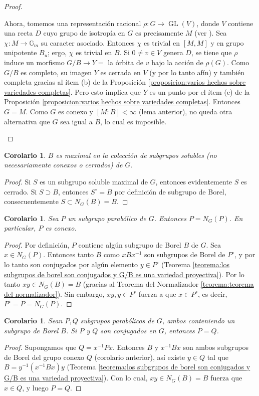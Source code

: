 \documentclass[spanish,10pt]{amsart}
\newtheorem{corollary}[theorem]{Corolario}
\theoremstyle{definition}
\theoremstyle{remark}
\numberwithin{equation}{section}
\begin{document}
\begin{proof}
\begin{enumerate}
Ahora, tomemos una representación racional $\rho : G \rightarrow \operatorname{GL}(V)$, donde $V$ contiene una recta $D$ cuyo grupo de isotropía en $G$ es precisamente $M$ (ver \cite[Teorema 11.2]{humphreys2012linearAlgebraicGroups}). Sea $\chi : M \to \mathbb{G}_m$ su caracter asociado. Entonces $\chi$ es trivial en $[M,M]$ y en grupo unipotente $B_u$; ergo, $\chi$ es trivial en $B$. Si $0 \neq v \in V$ genera $D$, se tiene que $\rho$ induce un morfismo $G/B \to Y =$ la órbita de $v$ bajo la acción de $\rho (G)$. Como $G/B$ es completo, su imagen $Y$ es cerrada en $V$ (y por lo tanto afín) y también completa gracias al ítem (b) de la Proposición \ref{proposicion:varios hechos sobre variedades completas}. Pero esto implica que $Y$ es un punto por el ítem (c) de la Proposición \ref{proposicion:varios hechos sobre variedades completas}. Entonces $G = M$. Como $G$ es conexo y $[M : B] < \infty$ (lema anterior), no queda otra alternativa que $G$ sea igual a $B$, lo cual es imposible.
\end{enumerate}
\end{proof}

\begin{corollary}
$B$ es maximal en la colección de subgrupos solubles (no necesariamente conexos o cerrados) de $G$.
\end{corollary}
\begin{proof}
Si $S$ es un subgrupo soluble maximal de $G$, entonces evidentemente $S$ es cerrado. Si $S \supset B$, entonces $S^\circ = B$ por definición de subgrupo de Borel, consecuentemente $S \subset N_G (B) = B$.
\end{proof}

\begin{corollary}
Sea $P$ un subgrupo parabólico de $G$. Entonces $P = N_G (P)$. En particular, $P$ es conexo.
\end{corollary}
\begin{proof}
Por definición, $P$ contiene algún subgrupo de Borel $B$ de $G$. Sea $x \in N_G (P)$. Entonces tanto $B$ como $x B x^{-1}$ son subgrupos de Borel de $P^\circ$, y por lo tanto son conjugados por algún elemento $y \in P^\circ$ (Teorema \ref{teorema:los subgrupos de borel son conjugados y G/B es una variedad proyectiva}). Por lo tanto $xy \in N_G (B) = B$ (gracias al Teorema del Normalizador \ref{teorema:teorema del normalizador}). Sin embargo, $xy, y \in P^\circ$ fuerza a que $x \in P^\circ$, es decir, $P^\circ = P = N_G (P)$.
\end{proof}

\begin{corollary}
Sean $P,Q$ subgrupos parabólicos de $G$, ambos conteniendo un subgrupo de Borel $B$. Si $P$ y $Q$ son conjugados en $G$, entonces $P = Q$.
\end{corollary}
\begin{proof}
Supongamos que $Q = x^{-1} P x$. Entonces $B$ y $x^{-1}B x$ son ambos subgrupos de Borel del grupo conexo $Q$ (corolario anterior), así existe $y \in Q$ tal que $B = y^{-1} (x ^{-1} B x) y$ (Teorema \ref{teorema:los subgrupos de borel son conjugados y G/B es una variedad proyectiva}). Con lo cual, $xy \in N_G (B) = B$ fuerza que $x \in Q$, y luego $P = Q$.
\end{proof}
\end{document}
